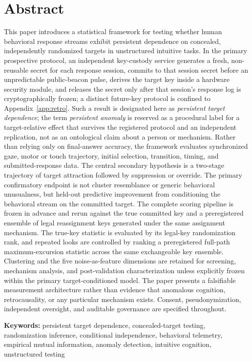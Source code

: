 \documentclass[11pt,letterpaper]{article}
\begin{document}
\section*{Abstract}
This paper introduces a statistical framework for testing whether human behavioral response streams exhibit persistent dependence on concealed, independently randomized targets in unstructured intuitive tasks. In the primary prospective protocol, an independent key-custody service generates a fresh, non-reusable secret for each response session, commits to that session secret before an unpredictable public-beacon pulse, derives the target key inside a hardware security module, and releases the secret only after that session's response log is cryptographically frozen; a distinct future-key protocol is confined to Appendix~\ref{app:retro}. Such a result is designated here as \textit{persistent target dependence}; the term \textit{persistent anomaly} is reserved as a procedural label for a target-relative effect that survives the registered protocol and an independent replication, not as an ontological claim about a person or mechanism. Rather than relying only on final-answer accuracy, the framework evaluates synchronized gaze, motor or touch trajectory, initial selection, transition, timing, and submitted-response data. The central secondary hypothesis is a two-stage trajectory of target attraction followed by suppression or override. The primary confirmatory endpoint is not cluster resemblance or generic behavioral unusualness, but held-out predictive improvement from conditioning the behavioral stream on the committed target. The complete scoring pipeline is frozen in advance and rerun against the true committed key and a preregistered ensemble of legal reassignment keys generated under the same assignment mechanism. The true-key statistic is evaluated by its legal-key randomization rank, and repeated looks are controlled by ranking a preregistered full-path maximum-excursion statistic across the same exchangeable key ensemble. Clustering and the five noise-as-feature dimensions are retained for screening, mechanism analysis, and post-validation characterization unless explicitly frozen within the primary target-conditioned model. The paper presents a falsifiable measurement architecture rather than evidence that anomalous cognition, retrocausality, or any particular mechanism exists. Consent, pseudonymization, independent oversight, and auditable governance are specified throughout.

\medskip
\noindent\textbf{Keywords:} persistent target dependence, concealed-target testing, randomization inference, conditional independence, behavioral telemetry, empirical mutual information, anomaly detection, intuitive cognition, unstructured testing
\end{document}
